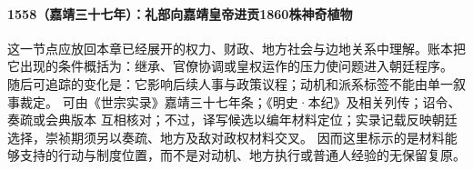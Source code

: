 \paragraph{1558（嘉靖三十七年）：礼部向嘉靖皇帝进贡1860株神奇植物} 这一节点应放回本章已经展开的权力、财政、地方社会与边地关系中理解。账本把它出现的条件概括为：继承、官僚协调或皇权运作的压力使问题进入朝廷程序。 随后可追踪的变化是：它影响后续人事与政策议程；动机和派系标签不能由单一叙事裁定。 可由《世宗实录》嘉靖三十七年条；《明史·本纪》及相关列传；诏令、奏疏或会典版本 互相核对；不过，译写候选以编年材料定位；实录记载反映朝廷选择，崇祯期须另以奏疏、地方及敌对政权材料交叉。 因而这里标示的是材料能够支持的行动与制度位置，而不是对动机、地方执行或普通人经验的无保留复原。

